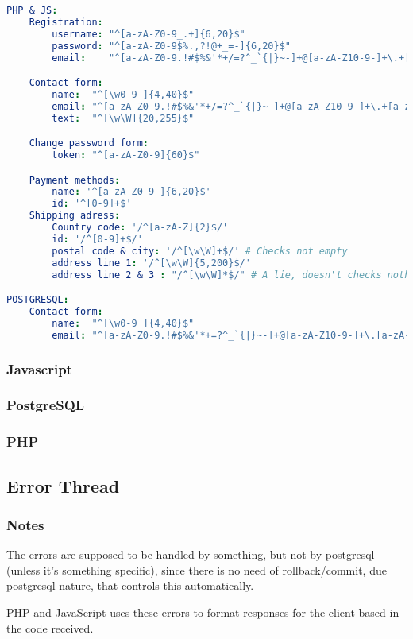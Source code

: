 \begin{lstlisting}[language=yaml,label={lst:regexListing}]
PHP & JS:
    Registration:
        username: "^[a-zA-Z0-9_.+]{6,20}$"
        password: "^[a-zA-Z0-9$%.,?!@+_=-]{6,20}$"
        email:    "^[a-zA-Z0-9.!#$%&'*+/=?^_`{|}~-]+@[a-zA-Z10-9-]+\.+[a-zA-Z0-9-]+$"

    Contact form:
        name:  "^[\w0-9 ]{4,40}$"
        email: "^[a-zA-Z0-9.!#$%&'*+/=?^_`{|}~-]+@[a-zA-Z10-9-]+\.+[a-zA-Z0-9-]+$"
        text:  "^[\w\W]{20,255}$"

    Change password form:
        token: "^[a-zA-Z0-9]{60}$"

    Payment methods:
        name: '^[a-zA-Z0-9 ]{6,20}$'
        id: '^[0-9]+$'
    Shipping adress:
        Country code: '/^[a-zA-Z]{2}$/'
        id: '/^[0-9]+$/'
        postal code & city: '/^[\w\W]+$/' # Checks not empty
        address line 1: '/^[\w\W]{5,200}$/'
        address line 2 & 3 : "/^[\w\W]*$/" # A lie, doesn't checks nothing

POSTGRESQL:
    Contact form:
        name:  "^[\w0-9 ]{4,40}$"
        email: "^[a-zA-Z0-9.!#$%&'*+=?^_`{|}~-]+@[a-zA-Z10-9-]+\.[a-zA-Z0-9-]+$"
\end{lstlisting}

\subsubsection[Javascript]{Javascript}
\subsubsection[PostgreSQL]{PostgreSQL}
\subsubsection[PHP]{PHP}

\subsection{Error Thread}\label{subsec:error-thread}
\subsubsection{Notes}\label{subsubsec:notes}
\begin{flushleft}
    The errors are supposed to be handled by something, but not by postgresql (unless it's something specific), since
    there is no need of rollback/commit, due postgresql nature, that controls this automatically.
\end{flushleft}
\begin{flushleft}
    PHP and JavaScript uses these errors to format responses for the client based in the code received.
\end{flushleft}

